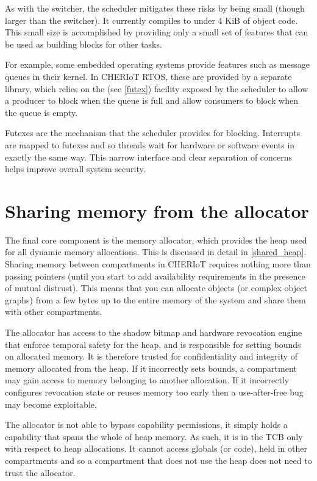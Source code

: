 As with the switcher, the scheduler mitigates these risks by being small (though larger than the switcher).
It currently compiles to under 4 KiB of object code.
This small size is accomplished by providing only a small set of features that can be used as building blocks for other tasks.

For example, some embedded operating systems provide features such as message queues in their kernel.
In CHERIoT RTOS, these are provided by a separate library, which relies on the  (see \ref{futex}) facility exposed by the scheduler to allow a producer to block when the queue is full and allow consumers to block when the queue is empty.

Futexes are the  mechanism that the scheduler provides for blocking.
Interrupts are mapped to futexes and so threads wait for hardware or software events in exactly the same way.
This narrow interface and clear separation of concerns helps improve overall system security.

\section{Sharing memory from the allocator}

The final core component is the memory allocator, which provides the heap used for all dynamic memory allocations.
This is discussed in detail in \ref{shared_heap}.
Sharing memory between compartments in CHERIoT requires nothing more than passing pointers (until you start to add availability requirements in the presence of mutual distrust).
This means that you can allocate objects (or complex object graphs) from a few bytes up to the entire memory of the system and share them with other compartments.

The allocator has access to the shadow bitmap and hardware revocation engine that enforce temporal safety for the heap, and is responsible for setting bounds on allocated memory.
It is therefore trusted for confidentiality and integrity of memory allocated from the heap.
If it incorrectly sets bounds, a compartment may gain access to memory belonging to another allocation.
If it incorrectly configures revocation state or reuses memory too early then a use-after-free bug may become exploitable.

The allocator is not able to bypass capability permissions, it simply holds a capability that spans the whole of heap memory.
As such, it is in the TCB only with respect to heap allocations.
It cannot access globals (or code), held in other compartments and so a compartment that does not use the heap does not need to trust the allocator.

